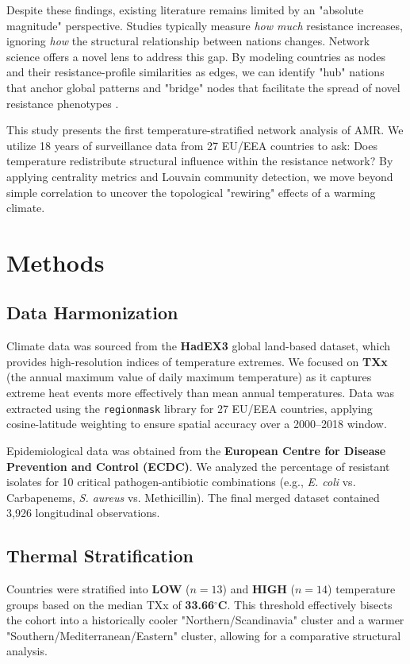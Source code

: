 \documentclass[11pt,a4paper]{article}
\begin{document}
Despite these findings, existing literature remains limited by an "absolute magnitude" perspective. Studies typically measure \textit{how much} resistance increases, ignoring \textit{how} the structural relationship between nations changes. Network science offers a novel lens to address this gap. By modeling countries as nodes and their resistance-profile similarities as edges, we can identify "hub" nations that anchor global patterns and "bridge" nodes that facilitate the spread of novel resistance phenotypes \cite{aboah2023mapping}.

This study presents the first temperature-stratified network analysis of AMR. We utilize 18 years of surveillance data from 27 EU/EEA countries to ask: Does temperature redistribute structural influence within the resistance network? By applying centrality metrics and Louvain community detection, we move beyond simple correlation to uncover the topological "rewiring" effects of a warming climate.

\section{Methods}\label{methods}
\subsection{Data Harmonization}
Climate data was sourced from the \textbf{HadEX3} global land-based dataset, which provides high-resolution indices of temperature extremes. We focused on \textbf{TXx} (the annual maximum value of daily maximum temperature) as it captures extreme heat events more effectively than mean annual temperatures. Data was extracted using the \texttt{regionmask} library for 27 EU/EEA countries, applying cosine-latitude weighting to ensure spatial accuracy over a 2000–2018 window.

Epidemiological data was obtained from the \textbf{European Centre for Disease Prevention and Control (ECDC)}. We analyzed the percentage of resistant isolates for 10 critical pathogen-antibiotic combinations (e.g., \textit{E. coli} vs. Carbapenems, \textit{S. aureus} vs. Methicillin). The final merged dataset contained 3,926 longitudinal observations.

\subsection{Thermal Stratification}
Countries were stratified into \textbf{LOW} ($n=13$) and \textbf{HIGH} ($n=14$) temperature groups based on the median TXx of \textbf{33.66$^\circ$C}. This threshold effectively bisects the cohort into a historically cooler "Northern/Scandinavia" cluster and a warmer "Southern/Mediterranean/Eastern" cluster, allowing for a comparative structural analysis.
\end{document}
